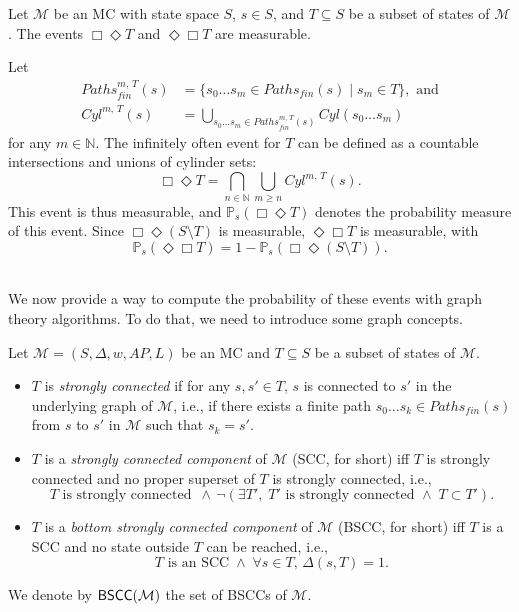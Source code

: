 \begin{lemma}
Let $\mathcal{M}$ be an MC with state space $S$, $s \in S$, and $T \subseteq S$ be a subset of states of $\mathcal{M}$. The events $\Box\Diamond T$ and $\Diamond \Box T$ are measurable.
\end{lemma}

\begin{proof2}
Let
  \begin{align*}
    Paths_{fin}^{m,\, T}(s) &= \{ s_0\dots s_m \in Paths_{fin}(s) \; | \; s_m \in T \}, \text{ and} \\
    Cyl^{m,\, T}(s) &= \bigcup_{s_0 \dots s_m \in Paths_{fin}^{m, \, T}(s)} Cyl(s_0\dots s_m)
  \end{align*}
  for any $m \in \mathbb{N}$.
  The infinitely often event for $T$ can be defined as a countable intersections and unions of cylinder sets:
  \[
    \Box \Diamond T = \bigcap_{n \in \mathbb{N}} \bigcup_{m \geq n} Cyl^{m, \, T}(s).
  \]
  This event is thus measurable, and $\mathbb{P}_s(\Box\Diamond T)$ denotes the probability measure of this event. Since $\Box \Diamond (S \setminus T)$ is measurable, $\Diamond \Box T$ is measurable, with \[\mathbb{P}_s(\Diamond \Box T) = 1 - \mathbb{P}_s(\Box \Diamond (S \setminus T)).\]
\end{proof2}
$ $\\

We now provide a way to compute the probability of these events with graph theory algorithms. To do that, we need to introduce some graph concepts.

\begin{definition}
Let \sloppy$\mathcal{M}=(S, \Delta, w, AP, L)$ be an MC and $T \subseteq S$ be a subset of states of $\mathcal{M}$.
\begin{itemize}
  \item $T$ is \textit{strongly connected} if for any $s, s' \in T$, $s$ is connected to $s'$ in the underlying graph of $\mathcal{M}$, i.e., if there exists a finite path $s_0 \dots s_k \in Paths_{fin}(s)$ from $s$ to $s'$ in $\mathcal{M}$ such that $s_k = s'$.
  \item $T$ is a \textit{strongly connected component} of $\mathcal{M}$ (SCC, for short) iff $T$ is strongly connected and no proper superset of $T$ is strongly connected, i.e.,
  \[ T \text{ is strongly connected } \, \wedge \,
  \neg(\exists T', \; T' \text{ is strongly connected } \wedge \;
    T \subset T'). \]
  \item $T$ is a \textit{bottom strongly connected component} of $\mathcal{M}$ (BSCC, for short) iff
  $T$ is a SCC and no state outside $T$ can be reached, i.e.,
  \[
  T \text{ is an SCC} \; \wedge \; \forall s \in T, \,\Delta(s, T) = 1.
  \]
\end{itemize}
We denote by $\textnormal{\sffamily BSCC}(\mathcal{M})$ the set of BSCCs of $\mathcal{M}$.
\end{definition}

